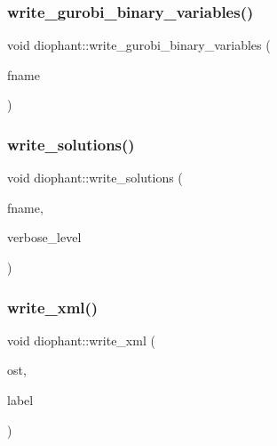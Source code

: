 \subsubsection{\texorpdfstring{write\+\_\+gurobi\+\_\+binary\+\_\+variables()}{write\_gurobi\_binary\_variables()}}
{\footnotesize\ttfamily void diophant\+::write\+\_\+gurobi\+\_\+binary\+\_\+variables (\begin{DoxyParamCaption}\item[{const \mbox{\hyperlink{galois_8h_ab6cc7b4aeb6ea31aba2b3fbfc83ff5e6}{B\+Y\+TE}} $\ast$}]{fname }\end{DoxyParamCaption})}

\mbox{\label{classdiophant_a5c17c2a311dd2e6b5d827810c68dc74e}} 
\subsubsection{\texorpdfstring{write\+\_\+solutions()}{write\_solutions()}}
{\footnotesize\ttfamily void diophant\+::write\+\_\+solutions (\begin{DoxyParamCaption}\item[{const \mbox{\hyperlink{galois_8h_ab6cc7b4aeb6ea31aba2b3fbfc83ff5e6}{B\+Y\+TE}} $\ast$}]{fname,  }\item[{\mbox{\hyperlink{galois_8h_a09fddde158a3a20bd2dcadb609de11dc}{I\+NT}}}]{verbose\+\_\+level }\end{DoxyParamCaption})}

\mbox{\label{classdiophant_adfbc14e5783cc749f4ddf1880aab63a0}} 
\subsubsection{\texorpdfstring{write\+\_\+xml()}{write\_xml()}}
{\footnotesize\ttfamily void diophant\+::write\+\_\+xml (\begin{DoxyParamCaption}\item[{ostream \&}]{ost,  }\item[{const \mbox{\hyperlink{galois_8h_ab6cc7b4aeb6ea31aba2b3fbfc83ff5e6}{B\+Y\+TE}} $\ast$}]{label }\end{DoxyParamCaption})}



